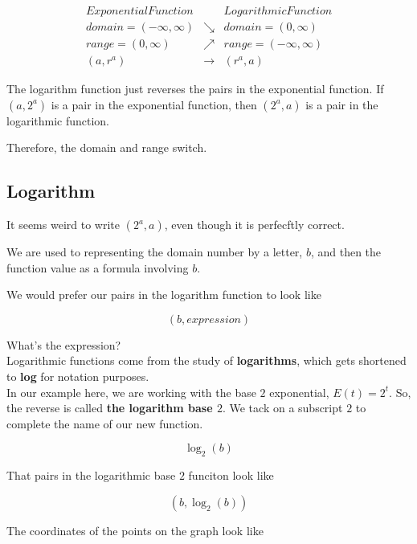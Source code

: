 \documentclass{ximera}
\begin{document}
\[
\begin{array}{lcl}
Exponential Function  &     &  Logarithmic Function  \\
domain = (-\infty, \infty)  &  \searrow  &  domain = (0, \infty)  \\
range = (0, \infty)  &  \nearrow  &  range = (-\infty, \infty)  \\
(a, r^a)    &  \longrightarrow  &   (r^a, a)
\end{array}
\]


The logarithm function just reverses the pairs in the exponential function.  If $(a, 2^a)$ is a pair in the exponential function, then $(2^a, a)$ is a pair in the logarithmic function.


Therefore, the domain and range switch. \\






\subsection{Logarithm}

It seems weird to write $(2^a, a)$, even though it is perfecftly correct.  

We are used to representing the domain number by a letter, $b$, and then the function value as a formula involving $b$.

We would prefer our pairs in the logarithm function to look like 

\[ (b, expression)  \]


What's the expression? \\





Logarithmic functions come from the study of \textbf{logarithms}, which gets shortened to \textbf{log} for notation purposes.  \\



In our example here, we are working with the base $2$ exponential, $E(t) = 2^t$. So, the reverse is called \textbf{the logarithm base $2$}.  We tack on a subscript $2$ to complete the name of our new function.



\[   \log_2(b)     \]


That pairs in the logarithmic base $2$ funciton look like 


\[
(b, \log_2(b))
\]


The coordinates of the points on the graph look like
\end{document}
